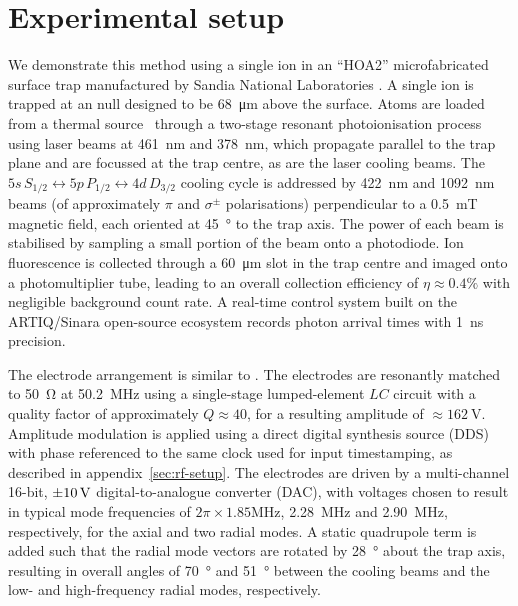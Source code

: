 \documentclass[pra,twocolumn]{revtex4-2}
\begin{document}
\section{Experimental setup}
\label{sec:experimental-setup}

We demonstrate this method using a single \srplus{} ion in an \enquote{HOA2} microfabricated surface trap manufactured by Sandia National Laboratories \cite{maunzHighOpticalAccess2016}.
A single \srplus{} ion is trapped at an \RF{} null designed to be \SI{68}{\micro\metre} above the surface.
Atoms are loaded from a thermal source~\cite{ballanceShortResponseTime2018} through a two-stage resonant photoionisation process using laser beams at \SI{461}{\nano\metre} and \SI{378}{\nano\metre}, which propagate parallel to the trap plane and are focussed at the trap centre, as are the laser cooling beams.
The $5s\, {S}_{1/2} \leftrightarrow 5p\, {P}_{1/2} \leftrightarrow 4d\, {D}_{3/2}$ cooling cycle is addressed by \SI{422}{\nm} and \SI{1092}{\nm} beams (of approximately $\pi$ and $\sigma^\pm$ polarisations) perpendicular to a \SI{0.5}{\milli\tesla} magnetic field, each oriented at \SI{45}{\degree} to the trap axis.
The power of each beam is stabilised by sampling a small portion of the beam onto a photodiode.
Ion fluorescence is collected through a \SI{60}{\micro\metre} slot in the trap centre and imaged onto a photomultiplier tube, leading to an overall collection efficiency of $\eta \approx 0.4\%$ with negligible background count rate.
A real-time control system built on the ARTIQ/Sinara open-source ecosystem \cite{ARTIQ} records photon arrival times with \SI{1}{\nano\second} precision.

The electrode arrangement is similar to .
The \RF{} electrodes are resonantly matched to \SI{50}{\ohm} at \SI{50.2}{\MHz} using a single-stage lumped-element $LC$ circuit with a quality factor of approximately $Q \approx 40$, for a resulting \RF{} amplitude of $\approx \SI{162}{\volt}$.
Amplitude modulation is applied using a direct digital synthesis source (DDS) with phase referenced to the same clock used for input timestamping, as described in appendix~\ref{sec:rf-setup}.
The \DC{} electrodes are driven by a multi-channel 16-bit, $\SI{\pm 10}{\volt}$ digital-to-analogue converter (DAC), with voltages chosen to result in typical mode frequencies of $2 \pi \times 1.85 \si{\MHz}$, \SI{2.28}{\MHz} and \SI{2.90}{\MHz}, respectively, for the axial and two radial modes.
A static quadrupole term is added such that the radial mode vectors are rotated by \SI{28}{\degree} about the trap axis, resulting in overall angles of \SI{70}{\degree} and \SI{51}{\degree} between the cooling beams and the low- and high-frequency radial modes, respectively.
\end{document}
